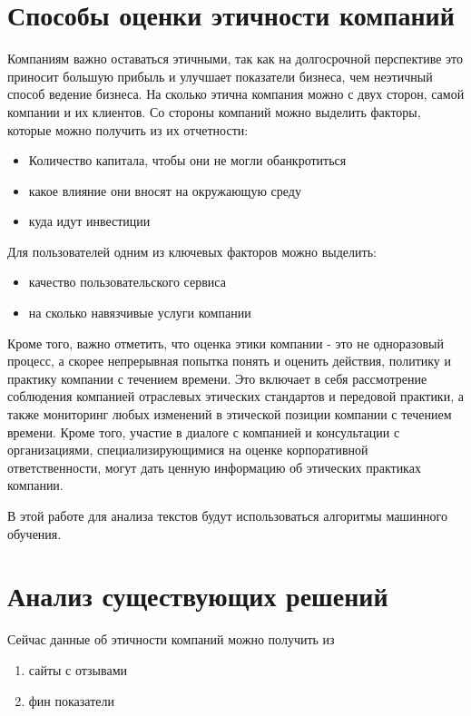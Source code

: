 \documentclass[PI, VKR]{HSEUniversity}
\begin{document}
\section{Способы оценки этичности компаний}
\label{sec:orgafb5099}
Компаниям важно оставаться этичными, так как на долгосрочной перспективе это приносит большую прибыль и улучшает показатели бизнеса, чем неэтичный способ ведение бизнеса\autocites{climent_ethical_2018}[][]{mure_esg_2021}. На сколько этична компания можно с двух сторон, самой компании и их клиентов. Со стороны компаний можно выделить факторы, которые можно получить из их отчетности:
\begin{itemize}
\item Количество капитала, чтобы они не могли обанкротиться
\item какое влияние они вносят на окружающую среду
\item куда идут инвестиции\autocite{harvey1995ethical}
\end{itemize}

Для пользователей одним из ключевых факторов можно выделить:
\begin{itemize}
\item качество пользовательского сервиса\autocite{brunk2010exploring}
\item на сколько навязчивые услуги компании\autocite{mitchell1992bank}
\end{itemize}

Кроме того, важно отметить, что оценка этики компании - это не одноразовый процесс, а скорее непрерывная попытка понять и оценить действия, политику и практику компании с течением времени. Это включает в себя рассмотрение соблюдения компанией отраслевых этических стандартов и передовой практики, а также мониторинг любых изменений в этической позиции компании с течением времени. Кроме того, участие в диалоге с компанией и консультации с организациями, специализирующимися на оценке корпоративной ответственности, могут дать ценную информацию об этических практиках компании.

В этой работе для анализа текстов будут использоваться алгоритмы машинного обучения.
\section{Анализ существующих решений}
\label{sec:org81222ac}
Сейчас данные об этичности компаний можно получить из
\begin{enumerate}
\item сайты с отзывами
\item фин показатели
\end{enumerate}
\end{document}
